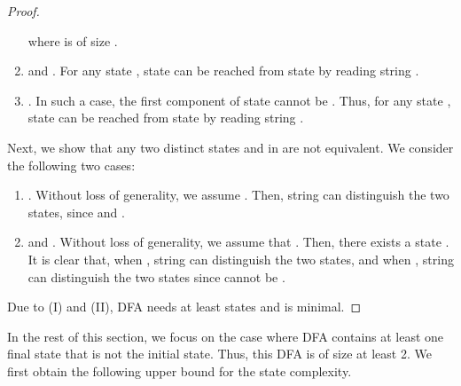 \documentclass[10pt]{article}
\begin{document}
\begin{proof}
\begin{enumerate}
    where  is of size .

    \item  and .
    For any state , state  can be reached from state  by reading string .

    \item .
    In such a case, the first component of state  cannot be .
    Thus, for any state , state  can be reached from state  by reading string .
    \end{enumerate}

    Next, we show that any two distinct states  and  in  are not equivalent.
    We consider the following two cases:
    \begin{enumerate}
    \item .
    Without loss of generality, we assume .
    Then, string  can distinguish the two states, since  and .

    \item  and .
    Without loss of generality, we assume that .
    Then, there exists a state .
    It is clear that, when , string  can distinguish the two states, and when , string  can distinguish the two states since  cannot be .
    \end{enumerate}

    Due to (I) and (II), DFA  needs at least  states and is minimal.
\end{proof}

In the rest of this section, we focus on the case where DFA  contains at least one final state that is not the initial state.
Thus, this DFA is of size at least 2.
We first obtain the following upper bound for the state complexity.
\end{document}

